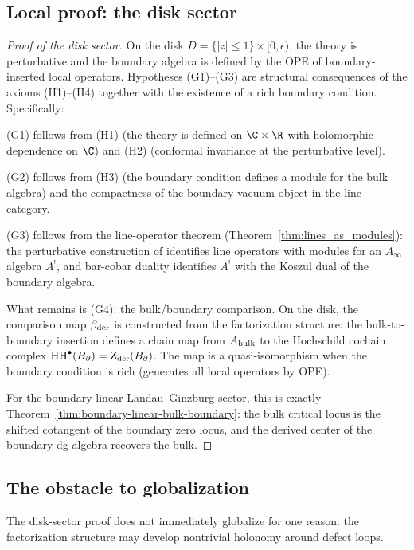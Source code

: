 \subsection{Local proof: the disk sector}

\begin{proof}[Proof of the disk sector]
On the disk $D=\{|z|\le 1\}\times[0,\epsilon)$, the theory is
perturbative and the boundary algebra is defined by the OPE of
boundary-inserted local operators. Hypotheses (G1)--(G3) are
structural consequences of the axioms (H1)--(H4) together with the
existence of a rich boundary condition. Specifically:

(G1) follows from (H1) (the theory is defined on $\C\times\R$
with holomorphic dependence on $\C$) and (H2) (conformal invariance
at the perturbative level).

(G2) follows from (H3) (the boundary condition defines a module
for the bulk algebra) and the compactness of the boundary vacuum
object in the line category.

(G3) follows from the line-operator theorem
(Theorem~\ref{thm:lines_as_modules}): the perturbative
construction of \cite{DNP25} identifies line operators with modules
for an $A_\infty$ algebra $A^!$, and bar-cobar duality identifies
$A^!$ with the Koszul dual of the boundary algebra.

What remains is (G4): the bulk/boundary comparison. On the disk,
the comparison map $\beta_{\mathrm{der}}$ is constructed from the
factorization structure: the bulk-to-boundary insertion defines a
chain map from $A_{\mathrm{bulk}}$ to the Hochschild cochain complex
$\operatorname{HH}^\bullet(B_{\partial})=\operatorname{Z}_{\mathrm{der}}(B_{\partial})$. The map is a
quasi-isomorphism when the boundary condition is rich (generates
all local operators by OPE).

For the boundary-linear Landau--Ginzburg sector, this is exactly
Theorem~\ref{thm:boundary-linear-bulk-boundary}: the bulk critical
locus is the shifted cotangent of the boundary zero locus, and the
derived center of the boundary dg algebra recovers the bulk.
\end{proof}


\subsection{The obstacle to globalization}

The disk-sector proof does not immediately globalize for one reason:
the factorization structure may develop nontrivial holonomy around
defect loops.

